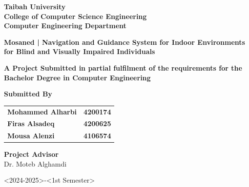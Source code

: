 \begin{titlepage}
    {\titlefont \textbf{Taibah University}}\\
    {\titlefont \textbf{College of Computer Science Engineering}}\\
    {\titlefont \textbf{Computer Engineering Department}}\\
    
    \vspace{1.8cm}
    
    {\titlefont \textbf{Mosaned | Navigation and Guidance System for Indoor Environments for Blind and Visually Impaired Individuals}}
    
    \vspace{1.8cm}

    {\titlefont \fontsize{14}{16} \textbf{A Project Submitted in partial fulfilment of the requirements for the Bachelor Degree in Computer Engineering}}
    \vspace{1.8cm}
    
    \vspace{1.2cm}
    
    \begin{minipage}{\textwidth}
    	\centering
    	{\titlefont \textbf{Submitted By}}\\
    	\vspace{1cm}
    	
    	\begin{tabular}{@{}l@{\hskip 4cm}r@{}}
    		{\titlefont \textbf{Mohammed Alharbi}} & {\titlefont \textbf{4200174}} \\
    		{\titlefont \textbf{Firas Alsadeq}} & {\titlefont \textbf{4200625}} \\
    		{\titlefont \textbf{Mousa Alenzi}} & {\titlefont \textbf{4106574}} \\
    	\end{tabular}
    \end{minipage}
    
    \vspace{1.8cm}

    {\selectfont\fontsize{14}{16}\normalfont
    \textbf{Project Advisor}\\
    Dr. Moteb Alghamdi
    }
    
    \vspace{2cm}

    {\selectfont\fontsize{14}{16}\normalfont
    \textless 2024-2025\textgreater-\textless 1st Semester\textgreater
    }

\end{titlepage}
